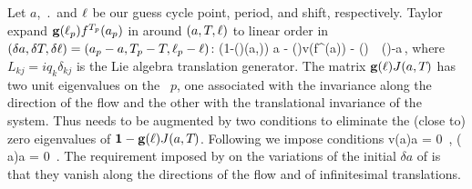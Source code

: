 Let $a$, $\period{}$ and $\ell$
be our guess cycle point, period, and shift, respectively.
Taylor expand $\mathbf{g}(\ell_p) {f^{{T_{p}}}(a_p)}$ in 
around  $(a, {T_{}}, \ell)$ to linear order in
$(\delta a,\delta {T_{}},\delta \ell)
   =(a_p-a,{T_{p}} - {T_{}},\ell_p-\ell)$:
\beq
    \left({1}-(\shift)\jMps(a,\period{})\right) \delta a
   - (\shift)v(f^{\period{}}(a)) \delta \period{}
                            - (\shift) \delta \shift
                    \,\simeq\, (\shift)-a\,,
    \label{eq:NewtonBasicCond}
\eeq
where %
$L_{kj}=i q_k \delta_{kj}$ is the Lie algebra translation
generator. The matrix $\mathbf{g}(\ell){J}(a,{T_{}})$
has two unit eigenvalues on the \rpo\ $p$,
one associated with the invariance along
the direction of the flow and the other with the
translational invariance of the system. Thus 
needs to be augmented by two conditions to
eliminate the (close to) zero eigenvalues of
$\mathbf{1}-\mathbf{g}(\ell){J}(a,{T_{}})$. Following
 we impose 
conditions
\beq
    v(a)\cdot\delta a  =  0
    \,,\qquad
    \left( a\right)\cdot \delta a  =  0
\,.
\label{eq:NewtonAux}
\eeq
The requirement imposed by 
on the variations of the initial $\delta a$ of 
is that they   vanish along the directions of the flow
and of infinitesimal translations.

